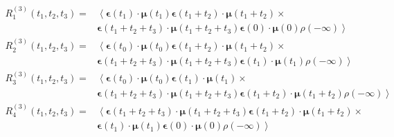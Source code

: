 \documentclass{article}
\newcommand{\vect}[1]{\ensuremath{\boldsymbol{\mathbf{#1}}}}
\begin{document}
\begin{equation}
\begin{split}
R_{1}^{(3)}(t_{1},t_{2},t_{3})=&\left\langle\vect{\epsilon}(t_{1})\cdot\vect{\mu}(t_{1})
				     \vect{\epsilon}(t_{1}+t_{2})\cdot\vect{\mu}(t_{1}+t_{2})\times\right.\\
				     &\left.\vect{\epsilon}(t_{1}+t_{2}+t_{3})\cdot\vect{\mu}(t_{1}+t_{2}+t_{3})
				     \vect{\epsilon}(0)\cdot\vect{\mu}(0)
				     \rho(-\infty)\right\rangle\\
R_{2}^{(3)}(t_{1},t_{2},t_{3})=&\left\langle\vect{\epsilon}(t_{0})\cdot\vect{\mu}(t_{0})
				     \vect{\epsilon}(t_{1}+t_{2})\cdot\vect{\mu}(t_{1}+t_{2})\times\right.\\
				     &\left.\vect{\epsilon}(t_{1}+t_{2}+t_{3})\cdot\vect{\mu}(t_{1}+t_{2}+t_{3})
				     \vect{\epsilon}(t_{1})\cdot\vect{\mu}(t_{1})
				     \rho(-\infty)\right\rangle\\
R_{3}^{(3)}(t_{1},t_{2},t_{3})=&\left\langle\vect{\epsilon}(t_{0})\cdot\vect{\mu}(t_{0})
				     \vect{\epsilon}(t_{1})\cdot\vect{\mu}(t_{1})\times\right.\\
				     &\left.\vect{\epsilon}(t_{1}+t_{2}+t_{3})\cdot\vect{\mu}(t_{1}+t_{2}+t_{3})
				     \vect{\epsilon}(t_{1}+t_{2})\cdot\vect{\mu}(t_{1}+t_{2})
				     \rho(-\infty)\right\rangle\\
R_{4}^{(3)}(t_{1},t_{2},t_{3})=&\left\langle\vect{\epsilon}(t_{1}+t_{2}+t_{3})\cdot\vect{\mu}(t_{1}+t_{2}+t_{3})
				     \vect{\epsilon}(t_{1}+t_{2})\cdot\vect{\mu}(t_{1}+t_{2})\times\right.\\
				     &\left.\vect{\epsilon}(t_{1})\cdot\vect{\mu}(t_{1})
				     \vect{\epsilon}(0)\cdot\vect{\mu}(0)
				     \rho(-\infty)\right\rangle\\
\end{split}
\end{equation}
\end{document}
